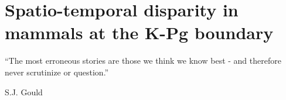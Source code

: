 

%
%

\chapter[Spatio-temporal disparity in mammals at the K-Pg boundary]{Spatio-temporal disparity in mammals at the K-Pg boundary}
\label{chap:STD_paper}

\bigskip
\medskip
\begin{center}

\begin{quoteshrink}
  ``The most erroneous stories are those we think we know best - and therefore never scrutinize or question.''

\hfill{S.J. Gould}


\end{quoteshrink}


 \\

\end{center}
%
%
